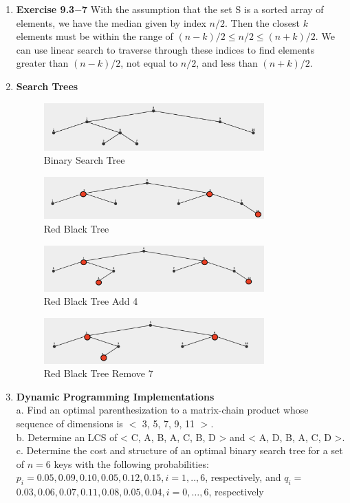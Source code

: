 \documentclass[a4paper,11pt,oneside]{book}
\begin{document}
\begin{enumerate}
  \item {\textbf{Exercise 9.3$-$7}} With the assumption that the set S is a sorted array of elements, we have the median given by
  index $n/2$. Then the closest $k$ elements must be within the range of $(n-k)/2 \le n/2 \le (n+k)/2$. We can use linear search 
  to traverse through these indices to find elements greater than $(n-k)/2$, not equal to $n/2$, and less than $(n+k)/2$.
  
  \item {\textbf{Search Trees}}
  \begin{figure}[h]
    \centering
    \includegraphics[width=0.8\textwidth]{6a.png}
    \caption{Binary Search Tree}\label{fig:6a}
  \end{figure}
  \begin{figure}[h]
    \centering
    \includegraphics[width=0.8\textwidth]{6b.png}
    \caption{Red Black Tree}\label{fig:6b}
  \end{figure}
  \begin{figure}
    \centering
    \includegraphics[width=0.8\textwidth]{6c.png}
    \caption{Red Black Tree Add 4}\label{fig:6c}
  \end{figure}
  \begin{figure}
    \centering
    \includegraphics[width=0.8\textwidth]{6d.png}
    \caption{Red Black Tree Remove 7}\label{fig:6d}
  \end{figure}
  
  \item {\textbf{Dynamic Programming Implementations}}
  \\ a. Find an optimal parenthesization to a matrix-chain product whose sequence of dimensions is $<$ 3, 5, 7, 9, 11 $>$.
  \\ b. Determine an LCS of < C, A, B, A, C, B, D > and < A, D, B, A, C, D >.
  \\ c. Determine the cost and structure of an optimal binary search tree for a set of $n=6$ keys with the following probabilities: $p_i=0.05,0.09,0.10,0.05,0.12,0.15, i=1, . ., 6$, respectively, and $q_i=$ $0.03,0.06,0.07,0.11,0.08,0.05,0.04, i=0, \ldots, 6$, respectively
  

\end{enumerate}
\end{document}
